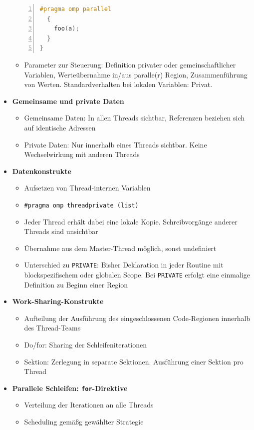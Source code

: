 \begin{itemize}
\begin{lstlisting}[frame=single,numbers=left,mathescape,language=C]
  #pragma omp parallel
  {
    foo(a);
  }
}
	\end{lstlisting}
	\begin{itemize}
		\item Parameter zur Steuerung: Definition privater oder gemeinschaftlicher Variablen, Werteübernahme in/aus paralle(r) Region, Zusammenführung von Werten. Standardverhalten bei lokalen Variablen: Privat.
	\end{itemize}
	\item \textbf{Gemeinsame und private Daten}
	\begin{itemize}
		\item Gemeinsame Daten: In allen Threads sichtbar, Referenzen beziehen sich auf identische Adressen
		\item Private Daten: Nur innerhalb eines Threads sichtbar. Keine Wechselwirkung mit anderen Threads
	\end{itemize}
	\item \textbf{Datenkonstrukte}
	\begin{itemize}
		\item Aufsetzen von Thread-internen Variablen
		\item \texttt{\#pragma omp threadprivate (list)}
		\item Jeder Thread erhält dabei eine lokale Kopie. Schreibvorgänge anderer Threads sind unsichtbar
		\item Übernahme aus dem Master-Thread möglich, sonst undefiniert
		\item Unterschied zu \texttt{PRIVATE}: Bisher Deklaration in jeder Routine mit blockspezifischem oder globalen Scope. Bei \texttt{PRIVATE} erfolgt eine einmalige Definition zu Beginn einer Region
	\end{itemize}
	\item \textbf{Work-Sharing-Konstrukte}
	\begin{itemize}
		\item Aufteilung der Ausführung des eingeschlossenen Code-Regionen innerhalb des Thread-Teams
		\item Do/for: Sharing der Schleifeniterationen
		\item Sektion: Zerlegung in separate Sektionen. Ausführung einer Sektion pro Thread
	\end{itemize}
	\item \textbf{Parallele Schleifen: \texttt{for}-Direktive}
	\begin{itemize}
		\item Verteilung der Iterationen an alle Threads
		\item Scheduling gemäßg gewählter Strategie

\end{itemize}
\end{itemize}
